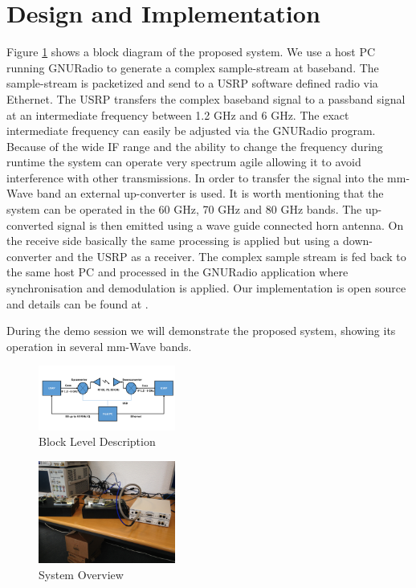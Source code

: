 \documentclass{acm_proc_article-sp}
\begin{document}
\section{Design and Implementation}
Figure \ref{fig:block} shows a block diagram of the proposed system. 
We use a host PC running GNURadio \cite{gnuradio} to generate a complex sample-stream at baseband. The sample-stream is packetized and send to a USRP \cite{ettus} software defined radio via Ethernet.
The USRP transfers the complex baseband signal to a passband signal at an intermediate frequency between 1.2 GHz and 6 GHz. The exact intermediate frequency can easily be adjusted via the GNURadio program. Because of the wide IF range and the ability to change the frequency during runtime the system can operate very spectrum agile allowing it to avoid interference with other transmissions.
In order to transfer the signal into the mm-Wave band an external up-converter is used. It is worth mentioning that the system can be operated in the 60 GHz, 70 GHz and 80 GHz bands.
The up-converted signal is then emitted using a wave guide connected horn antenna.
On the receive side basically the same processing is applied but using a down-converter and the USRP as a receiver. The complex sample stream is fed back to the same host PC and processed in the GNURadio application where synchronisation and demodulation is applied.
Our implementation is open source and details can be found at \cite{gr-inets}. 

During the demo session we will demonstrate the proposed system, showing its operation in several mm-Wave bands.

\begin{figure}
\center
\includegraphics[width=0.4\textwidth]{block-diagram}
\caption{Block Level Description}
\label{fig:block}
\end{figure}

\begin{figure}
\center
\includegraphics[width=0.4\textwidth]{system.jpg}
\caption{System Overview}
\label{fig:system}
\end{figure}
\balancecolumns
\end{document}
